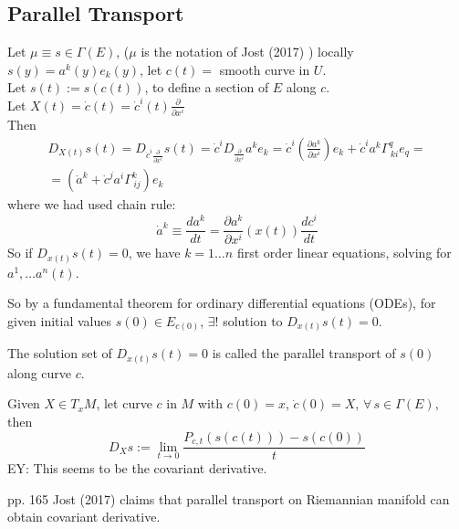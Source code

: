 \subsection{Parallel Transport}

Let $\mu \equiv s \in \Gamma(E)$, ($\mu$ is the notation of Jost (2017) \cite{dgdt:Jost2017}) locally $s(y) = a^k(y) e_k(y)$, let $c(t) =$ smooth curve in $U$. \\
Let $s(t):= s(c(t))$, to define a section of $E$ along $c$. \\
Let $X(t) = \dot{c}(t) = \dot{c}^i(t) \frac{\partial}{\partial x^i}$ \\

Then
\[
\begin{gathered}
	D_{X(t)} s(t) = D_{\dot{c}^i \frac{\partial}{\partial x^i} } s(t) = \dot{c}^i D_{ \frac{\partial }{\partial x^i}} a^k e_k = \dot{c}^i \left( \frac{ \partial a^k}{ \partial x^i} \right) e_k + \dot{c}^i a^k \Gamma^q_{\, ki} e_q = \\
	= \left( \dot{a}^k + \dot{c}^j a^i \Gamma^k_{\, ij} \right) e_k
\end{gathered}\]
where we had used chain rule:
\[
\dot{a}^k \equiv \frac{da^k}{dt} = \frac{\partial a^k}{\partial x^i} (x(t)) \frac{dc^i}{dt}
\]
So if $D_{x(t)} s(t) = 0$, we have $k=1 \dots n$ first order linear equations, solving for $a^1, \dots a^n(t)$.

So by a fundamental theorem for ordinary differential equations (ODEs), for given initial values $s(0) \in E_{c(0)}$, $\exists !$ solution to $D_{x(t)} s(t) = 0$.

\begin{definition}
The solution set of $D_{x(t)} s(t) = 0$	 is called the parallel transport of $s(0)$ along curve $c$.
\end{definition}

Given $X \in T_xM$, let curve $c$ in $M$ with $c(0) = x$, $\dot{c}(0) = X$, $\forall \, s \in \Gamma(E)$, then
\[
D_X s := \lim_{t \to 0} \frac{ P_{c,t}(s(c(t))) - s(c(0)) }{ t}
\]
EY: This seems to be the covariant derivative.

pp. 165 Jost (2017) \cite{dgdt:Jost2017} claims that parallel transport on Riemannian manifold can obtain covariant derivative.

